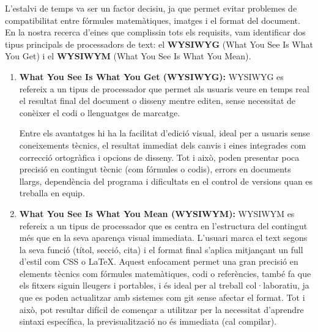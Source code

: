 L’estalvi de temps va ser un factor decisiu, ja que permet evitar problemes de compatibilitat entre fórmules matemàtiques, imatges i el format del document.
En la nostra recerca d’eines que complissin tots els requisits, vam identificar dos tipus principals de processadors de text: el \textbf{WYSIWYG} (What You See Is What You Get) i el \textbf{WYSIWYM} (What You See Is What You Mean).


 \begin{enumerate}
    \item \textbf{What You See Is What You Get (WYSIWYG):} WYSIWYG es refereix a un tipus de processador que permet als usuaris veure en temps real el resultat final del document o disseny mentre editen, sense necessitat de conèixer el codi o llenguatges de marcatge.

    Entre els avantatges hi ha la facilitat d'edició visual, ideal per a usuaris sense coneixements tècnics, el resultat immediat dels canvis i eines integrades com correcció ortogràfica i opcions de disseny. Tot i això, poden presentar poca precisió en contingut tècnic (com fórmules o codis), errors en documents llargs, dependència del programa i dificultats en el control de versions quan es treballa en equip.

    \item \textbf{What You See Is What You Mean (WYSIWYM):} WYSIWYM es refereix a un tipus de processador que es centra en l'estructura del contingut més que en la seva aparença visual immediata. L'usuari marca el text segons la seva funció (títol, secció, cita) i el format final s'aplica mitjançant un full d'estil com CSS o LaTeX. Aquest enfocament permet una gran precisió en elements tècnics com fórmules matemàtiques, codi o referències, també fa que els fitxers siguin lleugers i portables, i és ideal per al treball col·laboratiu, ja que es poden actualitzar amb sistemes com git sense afectar el format. Tot i això, pot resultar difícil de començar a utilitzar per la necessitat d'aprendre sintaxi específica, la previsualització no és immediata (cal compilar).%
\end{enumerate}

